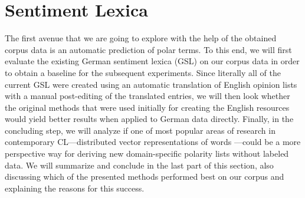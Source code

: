 

\section{Sentiment Lexica}\label{sec:snt:lex}

The first avenue that we are going to explore with the help of the
obtained corpus data is an automatic prediction of polar terms.
To this end, we will first evaluate the existing German sentiment
lexica (GSL) on our corpus data in order to obtain a baseline for the
subsequent experiments.  Since literally all of the current GSL were
created using an automatic translation of English opinion lists with a
manual post-editing of the translated entries, we will then look
whether the original methods that were used initially for creating the
English resources would yield better results when applied to German
data directly.  Finally, in the concluding step, we will analyze if
one of most popular areas of research in contemporary CL---distributed
vector representations of words \cite{Mikolov:13}---could be a more
perspective way for deriving new domain-specific polarity lists
without labeled data.  We will summarize and conclude in the last part
of this section, also discussing which of the presented methods
performed best on our corpus and explaining the reasons for this
success.


